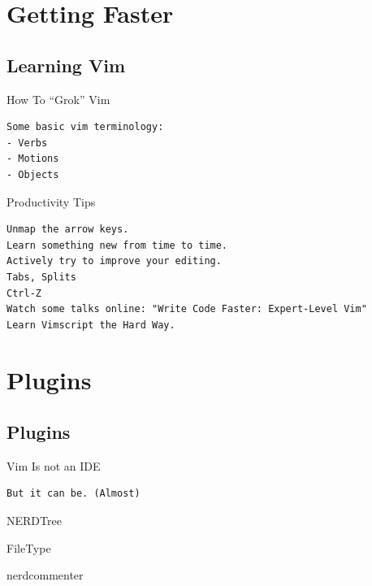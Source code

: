 \documentclass[aspectratio=169,12pt]{beamer}
\begin{document}
\section{Getting Faster}

\subsection{Learning Vim}

\begin{frame}[fragile]{How To ``Grok'' Vim}

\begin{verbatim}
Some basic vim terminology:
- Verbs
- Motions
- Objects
\end{verbatim}

\end{frame}

\begin{frame}[fragile]{Productivity Tips}

\begin{verbatim}
Unmap the arrow keys.
Learn something new from time to time.
Actively try to improve your editing.
Tabs, Splits
Ctrl-Z
Watch some talks online: "Write Code Faster: Expert-Level Vim"
Learn Vimscript the Hard Way.
\end{verbatim}

\end{frame}

\section{Plugins}

\subsection{Plugins}

\begin{frame}[fragile]{Vim Is not an IDE}

\begin{verbatim}
But it can be. (Almost)
\end{verbatim}

\end{frame}

\begin{frame}{NERDTree}

\end{frame}

\begin{frame}{FileType}

\end{frame}

\begin{frame}{nerdcommenter}

\end{frame}
\end{document}
